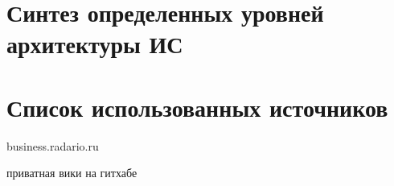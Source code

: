 \documentclass{article}
\begin{document}
\section{Синтез определенных уровней архитектуры ИС}


\pagebreak


\section{Список использованных источников}

business.radario.ru

приватная вики на гитхабе
\end{document}
